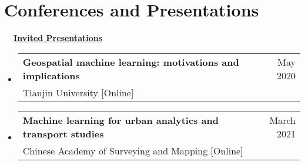 \documentclass[A4,11pt]{article}
\makeatletter
\newcommand{\CVSubheading}[4]{
  \vspace{-2pt}\item
    \begin{tabular*}{0.97\textwidth}[t]{l@{\extracolsep{\fill}}r}
      \textbf{#1} & #2 \\
      \small#3 & \small #4 \\
    \end{tabular*}\vspace{-7pt}
}
\newcommand{\CVSubHeadingListStart}{\begin{itemize}[leftmargin=0.5cm, label={}]}
\newcommand{\CVSubHeadingListEnd}{\end{itemize}}
\makeatother
\begin{document}

\begin{comment}
Again the title should have already been enough, but if it is necessary to add
descriptions maintain the consistency from prior sections
\end{comment}

\section{Conferences and Presentations}
\noindent \textbf{\ \ \underline{Invited Presentations}}
  \CVSubHeadingListStart
    \CVSubheading
      {Geospatial machine learning: motivations and implications}{May 2020}
      {Tianjin University [Online]}{}
    \CVSubheading
      {Machine learning for urban analytics and transport studies}{March 2021}
      {Chinese Academy of Surveying and Mapping [Online]}{}
  \CVSubHeadingListEnd
\end{document}
